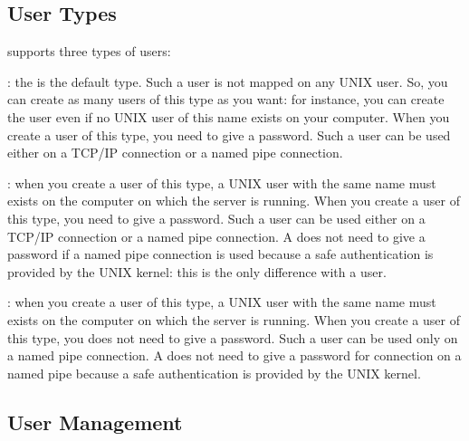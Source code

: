 \subsection{User Types}
\eyedb supports three types of \eyedb users:
\be
\item {}: the  is the default type.
Such a user is not mapped on any UNIX user. So, you can create as
many users of this type as you want: for instance, you can create the
user  even if no UNIX user of this name exists on your computer.
When you create a user of this type, you need to give a password. Such
a user can be used either on a TCP/IP connection or a named pipe connection.
\item {}: when you create a user of this type, a
UNIX user with the same name must exists on the computer on which
the \eyedb server is running. When you create a user of this type,
you need to give a password. Such
a user can be used either on a TCP/IP connection or a named pipe connection.
A  does not need to give a password if a named pipe
connection is used because a safe authentication is provided by
the UNIX kernel: this is the only difference with 
a  user.
\item {}:
when you create a user of this type, a
UNIX user with the same name must exists on the computer on which
the \eyedb server is running. When you create a user of this type,
you does not need to give a password. Such
a user can be used only on a named pipe connection.
A  does not need to give a password for connection
on a named pipe  because a safe authentication is provided by
the UNIX kernel.
\ee
\subsection{User Management}

